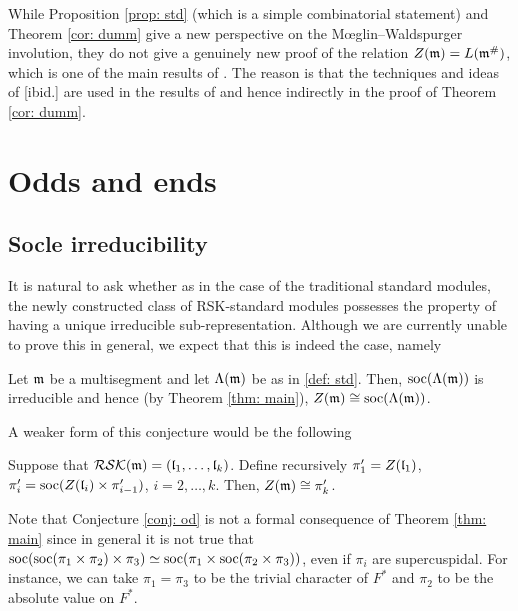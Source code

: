 \documentclass{ert-l} %
\begin{document}
\begin{remark}
While Proposition \ref{prop: std} (which is a simple combinatorial statement) and Theorem \ref{cor: dumm} give a new perspective
on the M\oe glin--Waldspurger involution, they do not give a genuinely
new proof of the relation $Z(\mathfrak{m})=L(\mathfrak{m}^\#)$, which is one of the main results of \cite{MR863522}.
The reason is that the techniques and ideas of [ibid.] are used in the results of \cite{MR3573961} and hence indirectly
in the proof of Theorem \ref{cor: dumm}.
\end{remark}

\section{Odds and ends} \label{sec: last}

\subsection{Socle irreducibility}
It is natural to ask whether as in the case of the traditional standard modules, the
newly constructed class of RSK-standard modules possesses the property of having a unique irreducible sub-representation.
Although we are currently unable to prove this in general, we expect that this is indeed the case, namely

\begin{conjecture} \label{conj: main}
Let $\mathfrak{m}$ be a multisegment and let $\Lambda(\mathfrak{m})$ be as in \eqref{def: std}.
Then, $\operatorname{soc}(\Lambda(\mathfrak{m}))$ is irreducible and hence (by Theorem \ref{thm: main}), $Z(\mathfrak{m})\cong \operatorname{soc}(\Lambda(\mathfrak{m}))$.
\end{conjecture}

A weaker form of this conjecture would be the following

\begin{conjecture} \label{conj: od}
Suppose that $\mathcal{RSK}(\mathfrak{m})=(\mathfrak{l}_1,\dots,\mathfrak{l}_k)$.
Define recursively $\pi'_1=Z(\mathfrak{l}_1)$, $\pi'_i=\operatorname{soc}(Z(\mathfrak{l}_i)\times \pi'_{i-1})$, $i=2,\dots,k$.
Then, $Z(\mathfrak{m})\cong \pi'_k$.
\end{conjecture}

Note that Conjecture \ref{conj: od} is not a formal consequence of Theorem \ref{thm: main}
since in general it is not true that $\operatorname{soc}(\operatorname{soc}(\pi_1\times\pi_2)\times\pi_3)\simeq
\operatorname{soc}(\pi_1\times\operatorname{soc}(\pi_2\times\pi_3))$, even if $\pi_i$ are supercuspidal.
For instance, we can take $\pi_1=\pi_3$ to be the trivial character of $F^*$ and $\pi_2$ to be
the absolute value on $F^*$.
\end{document}
